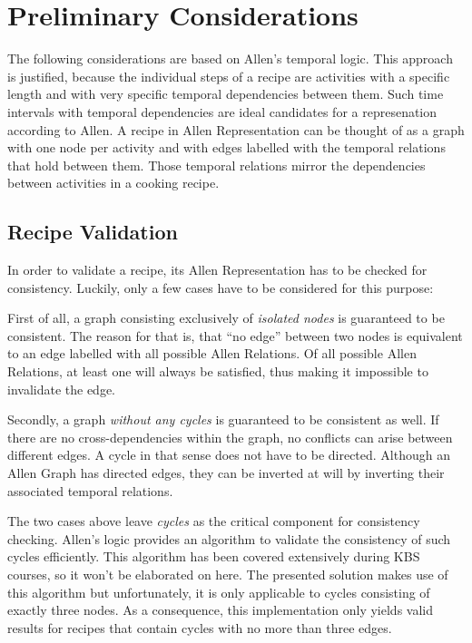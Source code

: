 \chapter{Preliminary Considerations}

    The  following considerations are based on Allen's temporal logic. This
    approach is justified, because the individual steps of a recipe are
    activities with a specific length and with very specific temporal dependencies
    between them. Such time intervals with temporal dependencies are ideal
    candidates for a represenation according to Allen. A
    recipe in Allen Representation can be thought of as a graph with one node
    per activity and with edges
    labelled with the temporal relations that hold between them. Those temporal
    relations mirror the dependencies between activities in a cooking recipe.
    
    \section{Recipe Validation}
    
    In order to validate a recipe, its Allen Representation has to be checked
    for consistency. Luckily, only a few cases have to be considered for this
    purpose:
    
    First of all, a graph consisting exclusively of \emph{isolated nodes}
    is guaranteed to be consistent. The reason for that is, that ``no edge''
    between two nodes is equivalent to an edge labelled with all possible
    Allen Relations. Of all possible Allen Relations, at least one will always
    be satisfied, thus making it impossible to invalidate the edge.
    
    Secondly, a graph \emph{without any cycles} is guaranteed to be consistent
    as well.
    If there are no cross-dependencies within the graph, no conflicts can arise between
    different edges. A cycle in that sense does not have to be directed.
    Although an Allen Graph has directed edges, they can be inverted at will by
    inverting their associated temporal relations.
    
    The two cases above leave \emph{cycles} as the critical component for
    consistency checking.
    Allen's logic provides an algorithm to validate the consistency of such
    cycles efficiently. This algorithm has been covered extensively during KBS
    courses, so it won't be elaborated on here. The presented solution makes use
    of this algorithm but unfortunately, it is only applicable to cycles
    consisting of exactly three nodes. As a consequence, this implementation
    only yields valid results for recipes that contain cycles with no more than
    three edges.
    
